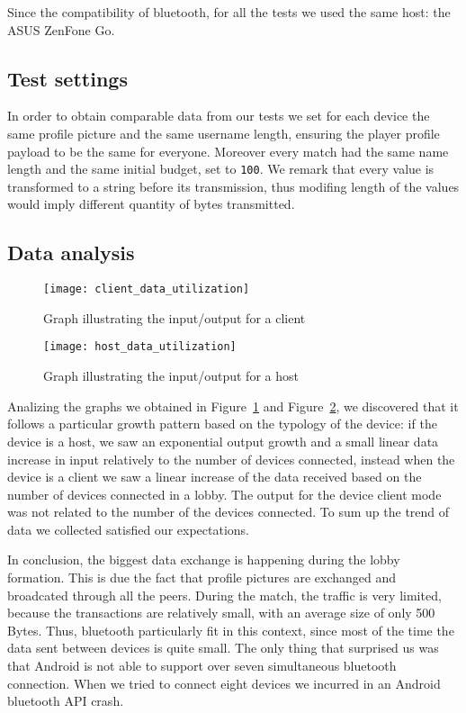 Since the compatibility of bluetooth, for all the tests we used the same host: 
the ASUS ZenFone Go.

\subsection{Test settings}

In order to obtain comparable data from our tests we set for each device 
the same profile picture and the same username length, ensuring the player 
profile payload to be the same for everyone. Moreover every match had the same 
name length and the same initial budget, set to \texttt{100}. We remark 
that every value is transformed to a string before its transmission, thus
modifing length of the values would imply different quantity of bytes transmitted.

\subsection{Data analysis}
\begin{figure}[t]
 \centering
 \texttt{[image: client\_data\_utilization]}
 \caption{Graph illustrating the input/output for a client}
 \label{fig:res:cdu}
\end{figure}

\begin{figure}[t]
 \centering
 \texttt{[image: host\_data\_utilization]}
 \caption{Graph illustrating the input/output for a host}
 \label{fig:res:hdu}
\end{figure}

Analizing the graphs we obtained in Figure~\ref{fig:res:cdu} and 
Figure~\ref{fig:res:hdu}, we discovered that it follows a particular growth 
pattern based on the typology of the device: if the device is a host, we saw an 
exponential output growth and a small linear data increase in input relatively 
to the number of devices connected, instead when the device is a client we saw a 
linear increase of the data received based on the number of devices connected in 
a lobby. The output for the device client mode was not related to the number of 
the devices connected. To sum up the trend of data we collected satisfied our 
expectations.

In conclusion, the biggest data exchange is happening during the lobby 
formation. This is due the fact that profile pictures are exchanged and 
broadcated through all the peers. During the match, the traffic is very 
limited, because the transactions are relatively small, with an average size of 
only 500 Bytes. Thus, bluetooth particularly fit in this context, since most of 
the time the data sent between devices is quite small.
The only thing that surprised us was that Android is not able to support over 
seven simultaneous bluetooth connection. When we tried to connect eight devices 
we incurred in an Android bluetooth API crash.
